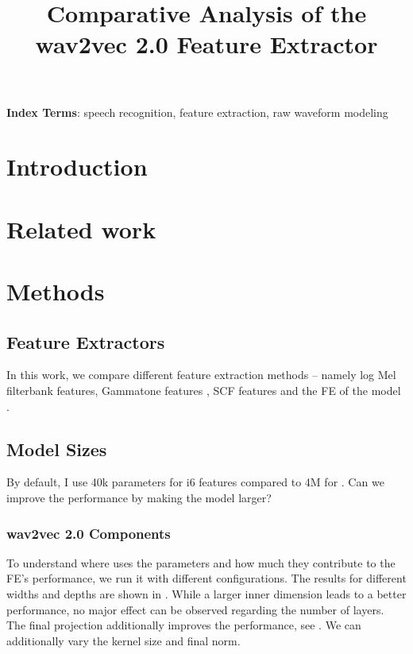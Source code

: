 \documentclass{INTERSPEECH2023}
\title{Comparative Analysis of the wav2vec 2.0 Feature Extractor}
\begin{document}
\maketitle
 
\begin{abstract}
\end{abstract}
\noindent\textbf{Index Terms}: speech recognition, feature extraction, raw waveform modeling


\section{Introduction}

\section{Related work}

\section{Methods}
\subsection{Feature Extractors}
In this work, we compare different feature extraction methods -- namely log Mel filterbank features, Gammatone features \cite{schlueter:icassp07}, \gls{SCF} features \cite{tuske2018:waveform} and the \gls{FE} of the \wvtwo model \cite{facebook2020wav2vec2}.

\subsection{Model Sizes}
By default, I use 40k parameters for i6 features compared to 4M for \wvtwo.
Can we improve the performance by making the model larger?
\subsubsection{wav2vec 2.0 Components}
To understand where \wvtwo uses the parameters and how much they contribute to the \gls{FE}'s performance, we run it with different configurations.
The results for different widths and depths are shown in .
While a larger inner dimension leads to a better performance, no major effect can be observed regarding the number of layers.
The final projection additionally improves the performance, see .
We can additionally vary the kernel size and final norm.
\end{document}
